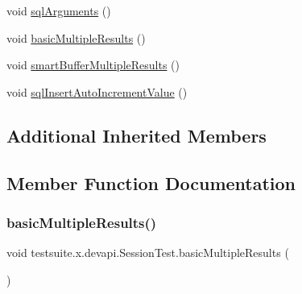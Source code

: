 \begin{DoxyCompactItemize}
\item 
void \mbox{\hyperlink{classtestsuite_1_1x_1_1devapi_1_1_session_test_aae134fc3879782dee3f0d6b3944bcab9}{sql\+Arguments}} ()
\item 
void \mbox{\hyperlink{classtestsuite_1_1x_1_1devapi_1_1_session_test_ae521014d977b1b3fd5f8add8e7ab5e14}{basic\+Multiple\+Results}} ()
\item 
void \mbox{\hyperlink{classtestsuite_1_1x_1_1devapi_1_1_session_test_a2508aa60fe1363ad0b87c110cd16909a}{smart\+Buffer\+Multiple\+Results}} ()
\item 
void \mbox{\hyperlink{classtestsuite_1_1x_1_1devapi_1_1_session_test_a417e20675ceeb33d9c3660de53bd118d}{sql\+Insert\+Auto\+Increment\+Value}} ()
\end{DoxyCompactItemize}
\subsection*{Additional Inherited Members}


\subsection{Member Function Documentation}
\mbox{\label{classtestsuite_1_1x_1_1devapi_1_1_session_test_ae521014d977b1b3fd5f8add8e7ab5e14}} 
\subsubsection{\texorpdfstring{basic\+Multiple\+Results()}{basicMultipleResults()}}
{\footnotesize\ttfamily void testsuite.\+x.\+devapi.\+Session\+Test.\+basic\+Multiple\+Results (\begin{DoxyParamCaption}{ }\end{DoxyParamCaption})}

\mbox{\label{classtestsuite_1_1x_1_1devapi_1_1_session_test_a01badad6c403d0997ca67aa9edfc4c35}} 

